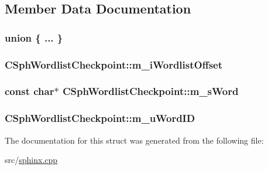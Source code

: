 \subsection{Member Data Documentation}
\hypertarget{structCSphWordlistCheckpoint_a22d229256f5b591e414252cbba5f229f}{\subsubsection[{"@11}]{\setlength{\rightskip}{0pt plus 5cm}union \{ ... \} }}\label{structCSphWordlistCheckpoint_a22d229256f5b591e414252cbba5f229f}
\hypertarget{structCSphWordlistCheckpoint_a8fdb1966528fc8cd3e59ed00a0b7ef56}{
\subsubsection[{m\-\_\-i\-Wordlist\-Offset}]{ C\-Sph\-Wordlist\-Checkpoint\-::m\-\_\-i\-Wordlist\-Offset}}\label{structCSphWordlistCheckpoint_a8fdb1966528fc8cd3e59ed00a0b7ef56}
\hypertarget{structCSphWordlistCheckpoint_a4f0bc15cd873c947f5cde1ecef94f606}{
\subsubsection[{m\-\_\-s\-Word}]{\setlength{\rightskip}{0pt plus 5cm}const char$\ast$ C\-Sph\-Wordlist\-Checkpoint\-::m\-\_\-s\-Word}}\label{structCSphWordlistCheckpoint_a4f0bc15cd873c947f5cde1ecef94f606}
\hypertarget{structCSphWordlistCheckpoint_ad97e6886426e191550c355b057eacfc5}{
\subsubsection[{m\-\_\-u\-Word\-I\-D}]{ C\-Sph\-Wordlist\-Checkpoint\-::m\-\_\-u\-Word\-I\-D}}\label{structCSphWordlistCheckpoint_ad97e6886426e191550c355b057eacfc5}


The documentation for this struct was generated from the following file\-:\begin{DoxyCompactItemize}
\item 
src/\hyperlink{sphinx_8cpp}{sphinx.\-cpp}\end{DoxyCompactItemize}
